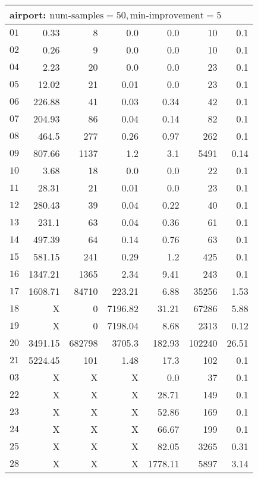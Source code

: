 \begin{longtable}{|c||r|r|r||r|r|r|}
\multicolumn{7}{|l|}{airport: $\text{num-samples}=50,\text{min-improvement}=5$}\\\hline
$01$ & 0.33 & 8 & 0.0 & 0.0 & 10 & 0.1 \\\hline
$02$ & 0.26 & 9 & 0.0 & 0.0 & 10 & 0.1 \\\hline
$04$ & 2.23 & 20 & 0.0 & 0.0 & 23 & 0.1 \\\hline
$05$ & 12.02 & 21 & 0.01 & 0.0 & 23 & 0.1 \\\hline
$06$ & 226.88 & 41 & 0.03 & 0.34 & 42 & 0.1 \\\hline
$07$ & 204.93 & 86 & 0.04 & 0.14 & 82 & 0.1 \\\hline
$08$ & 464.5 & 277 & 0.26 & 0.97 & 262 & 0.1 \\\hline
$09$ & 807.66 & 1137 & 1.2 & 3.1 & 5491 & 0.14 \\\hline
$10$ & 3.68 & 18 & 0.0 & 0.0 & 22 & 0.1 \\\hline
$11$ & 28.31 & 21 & 0.01 & 0.0 & 23 & 0.1 \\\hline
$12$ & 280.43 & 39 & 0.04 & 0.22 & 40 & 0.1 \\\hline
$13$ & 231.1 & 63 & 0.04 & 0.36 & 61 & 0.1 \\\hline
$14$ & 497.39 & 64 & 0.14 & 0.76 & 63 & 0.1 \\\hline
$15$ & 581.15 & 241 & 0.29 & 1.2 & 425 & 0.1 \\\hline
$16$ & 1347.21 & 1365 & 2.34 & 9.41 & 243 & 0.1 \\\hline
$17$ & 1608.71 & 84710 & 223.21 & 6.88 & 35256 & 1.53 \\\hline
$18$ & X & 0 & 7196.82 & 31.21 & 67286 & 5.88 \\\hline
$19$ & X & 0 & 7198.04 & 8.68 & 2313 & 0.12 \\\hline
$20$ & 3491.15 & 682798 & 3705.3 & 182.93 & 102240 & 26.51 \\\hline
$21$ & 5224.45 & 101 & 1.48 & 17.3 & 102 & 0.1 \\\hline
$03$ &  X &  X &  X & 0.0 & 37 & 0.1 \\\hline
$22$ &  X &  X &  X & 28.71 & 149 & 0.1 \\\hline
$23$ &  X &  X &  X & 52.86 & 169 & 0.1 \\\hline
$24$ &  X &  X &  X & 66.67 & 199 & 0.1 \\\hline
$25$ &  X &  X &  X & 82.05 & 3265 & 0.31 \\\hline
$28$ &  X &  X &  X & 1778.11 & 5897 & 3.14 \\\hline

\end{longtable}
